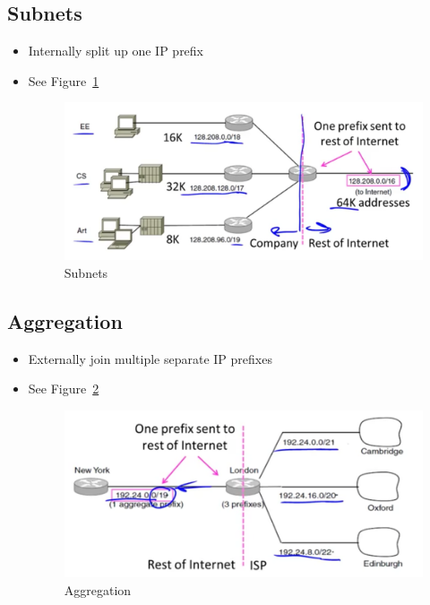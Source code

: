 \documentclass[12pt]{ctexart}   %
\begin{document}
	\subsection{Subnets}
	\begin{itemize}
		\item Internally split up one IP prefix
		\item See Figure~\ref{fig:5-10-3}
			
		\begin{figure}[h!] %
		\centering
		 \includegraphics[scale=0.7]{images/5-10-3}
		\caption{ Subnets }
		 \label{fig:5-10-3}
		 \end{figure}
	\end{itemize}
	
	\subsection{Aggregation}
	\begin{itemize}
		\item Externally join multiple separate IP prefixes
		\item See Figure~\ref{fig:5-10-4}
			
		\begin{figure}[h!] %
		\centering
		 \includegraphics[scale=0.7]{images/5-10-4}
		\caption{ Aggregation }
		 \label{fig:5-10-4}
		 \end{figure}
	\end{itemize}
	
\end{document}
